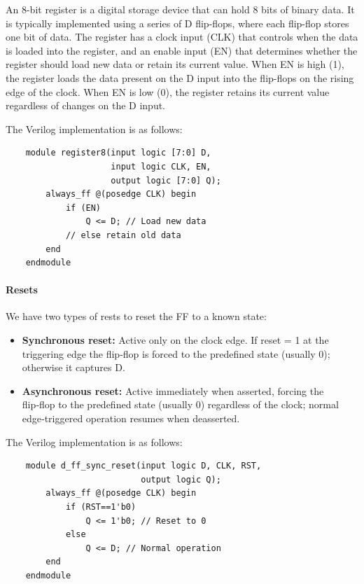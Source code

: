 \documentclass[11pt]{report}
\begin{document}
\begin{definition}
    An 8-bit register is a digital storage device that can hold 8 bits of binary data. It is typically implemented using a series of D flip-flops, where each flip-flop stores one bit of data. The register has a clock input (CLK) that controls when the data is loaded into the register, and an enable input (EN) that determines whether the register should load new data or retain its current value. When EN is high (1), the register loads the data present on the D input into the flip-flops on the rising edge of the clock. When EN is low (0), the register retains its current value regardless of changes on the D input.

    The Verilog implementation is as follows:
    \begin{verbatim}
    module register8(input logic [7:0] D,
                     input logic CLK, EN,
                     output logic [7:0] Q);
        always_ff @(posedge CLK) begin
            if (EN)
                Q <= D; // Load new data
            // else retain old data
        end
    endmodule
    \end{verbatim}
    
\end{definition}

\paragraph{Resets} We have two types of rests to reset the FF to a known state:
\begin{itemize}
    \item \textbf{Synchronous reset:} Active only on the clock edge. If reset = 1 at the triggering edge the flip‑flop is forced to the predefined state (usually 0); otherwise it captures D.
    \item \textbf{Asynchronous reset:} Active immediately when asserted, forcing the flip‑flop to the predefined state (usually 0) regardless of the clock; normal edge‑triggered operation resumes when deasserted.
\end{itemize}
\begin{definition}
    The Verilog implementation is as follows:
    \begin{verbatim}
    module d_ff_sync_reset(input logic D, CLK, RST,
                           output logic Q);
        always_ff @(posedge CLK) begin
            if (RST==1'b0)
                Q <= 1'b0; // Reset to 0
            else
                Q <= D; // Normal operation
        end
    endmodule
    \end{verbatim}
    
\end{definition}
\end{document}
